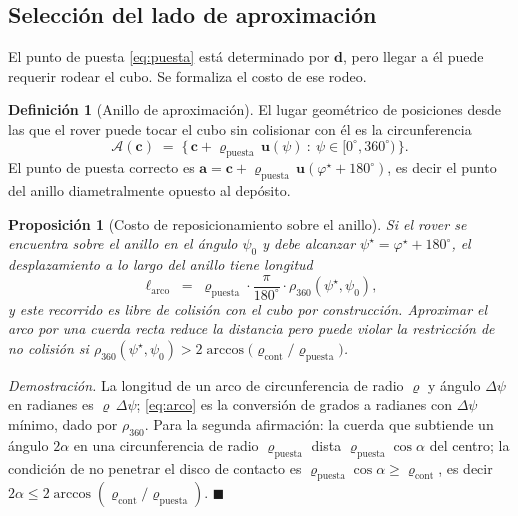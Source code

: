 \documentclass[11pt,a4paper]{article}
\newtheorem{proposicion}[teorema]{Proposición}
\theoremstyle{definition}
\newtheorem{definicion}[teorema]{Definición}
\newenvironment{demo}{\par\noindent\textit{Demostración.}\;}{\hfill$\blacksquare$\par\medskip}
\newcommand{\uu}{\mathbf{u}}
\newcommand{\dd}{\mathbf{d}}
\newcommand{\cc}{\mathbf{c}}
\newcommand{\aaa}{\mathbf{a}}
\newcommand{\grados}{^{\circ}}
\begin{document}
\subsection{Selección del lado de aproximación}

El punto de puesta \eqref{eq:puesta} está determinado por $\dd$, pero llegar a él puede
requerir rodear el cubo. Se formaliza el costo de ese rodeo.

\begin{definicion}[Anillo de aproximación]
El lugar geométrico de posiciones desde las que el rover puede tocar el cubo sin
colisionar con él es la circunferencia
\begin{equation}
  \mathcal A(\cc) \;=\; \big\{\, \cc + \varrho_{\mathrm{puesta}}\,\uu(\psi) \ :\ \psi \in [0\grados,360\grados) \,\big\}.
\end{equation}
El punto de puesta correcto es $\aaa = \cc + \varrho_{\mathrm{puesta}}\,\uu(\varphi^\star + 180\grados)$,
es decir el punto del anillo diametralmente opuesto al depósito.
\end{definicion}

\begin{proposicion}[Costo de reposicionamiento sobre el anillo]
\label{prop:anillo}
Si el rover se encuentra sobre el anillo en el ángulo $\psi_0$ y debe alcanzar
$\psi^\star = \varphi^\star + 180\grados$, el desplazamiento a lo largo del anillo tiene
longitud
\begin{equation}
  \ell_{\mathrm{arco}} \;=\; \varrho_{\mathrm{puesta}}\cdot \frac{\pi}{180\grados}\cdot \rho_{360}(\psi^\star, \psi_0),
  \label{eq:arco}
\end{equation}
y este recorrido es libre de colisión con el cubo por construcción. Aproximar el arco
por una cuerda recta reduce la distancia pero puede violar la restricción de no
colisión si $\rho_{360}(\psi^\star,\psi_0) > 2\arccos\!\big(\varrho_{\mathrm{cont}}/\varrho_{\mathrm{puesta}}\big)$.
\end{proposicion}

\begin{demo}
La longitud de un arco de circunferencia de radio $\varrho$ y ángulo $\Delta\psi$ en
radianes es $\varrho\,\Delta\psi$; \eqref{eq:arco} es la conversión de grados a
radianes con $\Delta\psi$ mínimo, dado por $\rho_{360}$. Para la segunda afirmación: la
cuerda que subtiende un ángulo $2\alpha$ en una circunferencia de radio
$\varrho_{\mathrm{puesta}}$ dista $\varrho_{\mathrm{puesta}}\cos\alpha$ del centro; la
condición de no penetrar el disco de contacto es
$\varrho_{\mathrm{puesta}}\cos\alpha \ge \varrho_{\mathrm{cont}}$, es decir
$2\alpha \le 2\arccos(\varrho_{\mathrm{cont}}/\varrho_{\mathrm{puesta}})$.
\end{demo}
\end{document}
